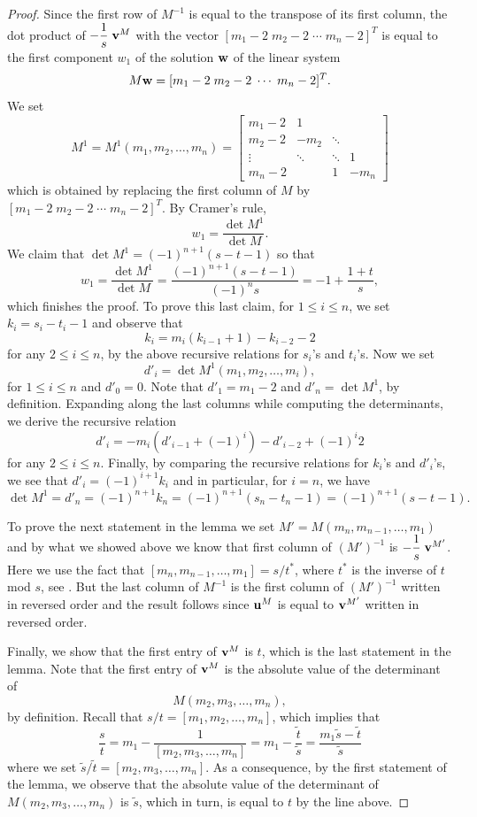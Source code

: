 \documentclass[11pt]{amsart}
\theoremstyle{plain}
\theoremstyle{definition}
\theoremstyle{remark}
\numberwithin{theorem}{section}
\begin{document}
\begin{proof}
Since the first row of $M^{-1}$ is equal to the transpose of its first column,  the dot product of $-\dfrac{1}{s}   \; {\bf v}^M$ with the vector $[m_1-2 \; m_2-2 \; \cdots \; m_n-2]^T$ is equal to the first component $w_1$ of the solution ${\bf w}$  of the linear system $$M {\bf w} = [m_1-2 \; m_2-2 \; \cdots \; m_n-2]^T.$$ We set  $$ M^1=M^1(m_1, m_2, \ldots, m_n)= \left[\begin{array}{cccc}
 m_1-2 & 1 & &   \\
m_2-2 & -m_2 & \ddots & \\
 \vdots & \ddots & \ddots & 1 \\
 m_n-2 & & 1 & -m_n 
\end{array}\right]$$ which is obtained by replacing the first column of $M$ by $[m_1-2 \; m_2-2 \; \cdots \; m_n-2]^T$. By Cramer's rule,   $$w_1=\frac{\det M^1}{\det M}.$$  We  claim that $\det M^1=(-1)^{n+1} (s-t-1)$ so that $$w_1 = \dfrac{\det M^1}{\det M}=\dfrac{(-1)^{n+1} (s-t-1)}{ (-1)^n s}= -1+ \dfrac{1+t}{s},$$  which finishes the proof.   To prove this last  claim, for $1 \leq i \leq n$, we set $k_i=s_i-t_i-1$ and  observe that 
\[
k_i=m_i(k_{i-1}+1)-k_{i-2}-2
\] 
for any $ 2 \leq i \leq n$, by the above recursive relations for $s_i$'s and $t_i$'s. Now we set 
\[
d'_i=\det M^1(m_1, m_2, \dots, m_i),
\] 
for $1\leq i\leq n$ and $d'_0=0$.
Note that $d'_1=m_1-2$ and $d'_n=\det M^1$, by definition.  Expanding along the last columns while computing the determinants, we derive the recursive relation  $$d'_i=-m_i (d'_{i-1}+(-1)^i)-d'_{i-2}+(-1)^i 2$$  for any $ 2 \leq i \leq n$. Finally,  by comparing the recursive relations for $k_i$'s and $d'_i$'s, we see that $d'_i= (-1)^{i+1}k_i$ and in particular, for $i=n$,  we have $$ \det M^1=d'_n= (-1)^{n+1}k_n=(-1)^{n+1}(s_n-t_n-1)=(-1)^{n+1}(s-t-1).$$

To prove the next  statement in the lemma we set $M'=M(m_n, m_{n-1}, \dots, m_1)$ and by what we showed above we know that first column of $(M')^{-1}$ is  $-\dfrac{1}{s}\; {\bf v}^{M'}$. Here we use the fact that $[m_n, m_{n-1}, \dots, m_1]=s/t^*$, where $t^*$ is the inverse of $t$ mod $s$, see \cite[Lemma~A4]{OrlikWagreich77}. But the last column of $M^{-1}$ is the first column of $(M')^{-1}$ written in reversed order and the result follows since ${\bf u}^M$ is equal to $ {\bf v}^{M'}$ written in reversed order.

Finally, we show that  the first entry of  ${\bf v}^M$ is $t$, which is the last statement in the  lemma. Note that the first entry of  ${\bf v}^M$ is the absolute value of the determinant of $$M(m_2, m_3, \dots, m_n),$$ by definition. Recall that $s/t=[m_1, m_2, \ldots, m_n]$, which implies that $$\frac{s}{t}=m_1-\frac{1}{[m_2, m_3, \ldots, m_n]}=m_1-\frac{\widetilde{t}}{\widetilde{s}}=\frac{m_1\widetilde{s}-\widetilde{t}}{\widetilde{s}} $$ where we set $\widetilde{s}/\widetilde{t} =[m_2, m_3, \ldots, m_n]$. As a consequence, by the first statement of the lemma, we observe that the absolute value of the determinant of $M(m_2, m_3, \dots, m_n)$ is $\widetilde{s}$, which in turn, is equal to $t$ by the line above. 
\end{proof}
\end{document}
